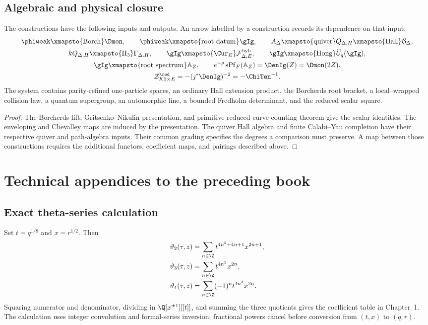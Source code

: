 \chapter{Algebraic and physical closure}
\begin{theorem}
The constructions have the following inputs and outputs. An arrow
labelled by a construction records its dependence on that input:
\[
\begin{gathered}
 \phiweak\xmapsto{\mathrm{Borch}}\Dmon,
 \qquad
 \phiweak\xmapsto{\mathrm{root\ datum}}\gIg,
 \qquad
 A_\Delta\xmapsto{\mathrm{quiver}}Q_{\Delta,H}
 \xmapsto{\mathrm{Hall}}\mathcal B_\Delta,\\
 kQ_{\Delta,H}\xmapsto{\Pi_3}\Gamma_{\Delta,H},
 \qquad
 \gIg\xmapsto{\Cur_E}\mathcal F^{\mathrm{hyb}}_{\Delta,E},
 \qquad
 \gIg\xmapsto{\mathrm{Hong}}\widehat U_q(\gIg),\\
 \gIg\xmapsto{\mathrm{root\ spectrum}}\mathbb A_Z,
 \qquad
 e^{-\rho}\operatorname{sPf}_F(\mathbb A_Z)=\DenIg(Z)=\Dmon(2Z),\\
 \mathcal Z^{\red}_{K3\times E}=-(\jmath^*\DenIg)^{-2}=-\ChiTen^{-1}.
\end{gathered}
\]
The system contains parity-refined one-particle spaces, an ordinary Hall extension product, the Borcherds root bracket, a local--wrapped collision law, a quantum supergroup, an automorphic line, a bounded Fredholm determinant, and the reduced scalar square.
\end{theorem}
\begin{proof}
The Borcherds lift, Gritsenko--Nikulin presentation, and primitive
reduced curve-counting theorem give the scalar identities. The
enveloping and Chevalley maps are induced by the presentation.
The quiver Hall algebra and finite Calabi--Yau completion have their
respective quiver and path-algebra inputs. Their common grading
specifies the degrees a comparison must preserve. A map between
those constructions requires the additional functors, coefficient
maps, and pairings described above.
\end{proof}


\part{Technical appendices to the preceding book}
\chapter{Exact theta-series calculation}\label{app:theta-computation}
Set $t=q^{1/8}$ and $x=r^{1/2}$. Then
\[
\begin{aligned}
\vartheta_2(\tau,z)&=\sum_{n\in\Z}t^{4n^2+4n+1}x^{2n+1},\\
\vartheta_3(\tau,z)&=\sum_{n\in\Z}t^{4n^2}x^{2n},\\
\vartheta_4(\tau,z)&=\sum_{n\in\Z}(-1)^nt^{4n^2}x^{2n}.
\end{aligned}
\]
Squaring numerator and denominator, dividing in $\Q[x^{\pm1}][[t]]$, and summing the three quotients gives the coefficient table in Chapter~1. The calculation uses integer convolution and formal-series inversion; fractional powers cancel before conversion from $(t,x)$ to $(q,r)$.

